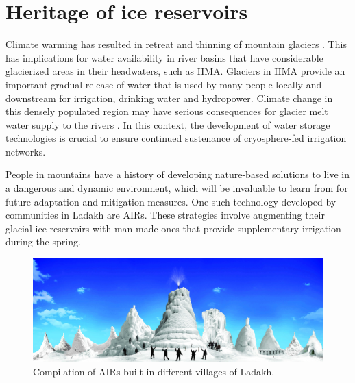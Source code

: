 \chapter{Heritage of ice reservoirs}


Climate warming has resulted in retreat and thinning of mountain glaciers
\citep{ipccCrossChapterPaperMountains2022}. This has implications for water availability in river basins that
have considerable glacierized areas in their headwaters, such as \ac{HMA}. Glaciers in \ac{HMA} provide an important
gradual release of water that is used by many people locally and downstream for irrigation, drinking water and
hydropower. Climate change in this densely populated region may have serious consequences for glacier melt water
supply to the rivers \citep{immerzeelImportanceVulnerabilityWorld2020}. In this context, the development of
water storage technologies is crucial to ensure continued sustenance of cryosphere-fed irrigation networks.

People in mountains have a history of developing nature-based solutions to live in a dangerous and dynamic
environment, which will be invaluable to learn from for future adaptation and mitigation measures. One such
technology developed by communities in Ladakh are \ac{AIRs}. These strategies involve augmenting their glacial
ice reservoirs with man-made ones that provide supplementary irrigation during the spring.

\begin{figure}[htb]
	\includegraphics[width=\textwidth]{figs/AIRs_Ladakh}
	\caption{Compilation of AIRs built in different villages of Ladakh.}
	\label{fig:airs_ladakh}
\end{figure}

